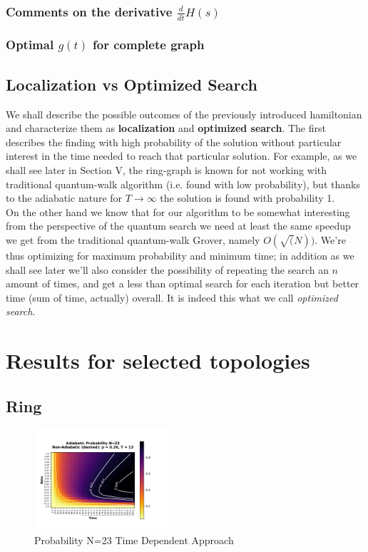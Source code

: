 \documentclass[aps,pra,reprint, onecolumn]{revtex4-2}
\begin{document}
\subsubsection{Comments on the derivative $\frac{d}{dt}H(s)$}
\subsubsection{Optimal $g(t)$ for complete graph}

\subsection{Localization vs Optimized Search}
We shall describe the possible outcomes of the previously introduced hamiltonian and characterize them as \textbf{localization} and \textbf{optimized search}. The first describes the finding with high probability of the solution without particular interest in the time needed to reach that particular solution. For example, as we shall see later in Section V, the ring-graph is known for not working with traditional quantum-walk algorithm (i.e. found with low probability), but thanks to the adiabatic nature for $T \to \infty$ the solution is found with probability 1. \\

On the other hand we know that for our algorithm to be somewhat interesting from the perspective of the quantum search we need at least the same speedup we get from the traditional quantum-walk Grover, namely $O(\sqrt(N))$. We're thus optimizing for maximum probability and minimum time; in addition as we shall see later we'll also consider the possibility of repeating the search an $n$ amount of times, and get a less than optimal search for each iteration but better time (sum of time, actually) overall. It is indeed this what we call \textit{optimized search}.


\section{Results for selected topologies}

\subsection{Ring}

\begin{figure}[ht]
\includegraphics[width=50mm]{./figures/23_probability_heatmap.pdf}%
\caption{Probability N=23 Time Dependent Approach}
\end{figure}
\end{document}
